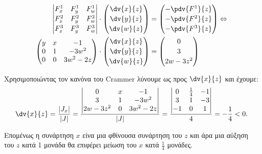\begin{solution}
  \begin{align*}
    \begin{vmatrix}
      F^1_x & F^1_y & F^1_w \\[2pt]
      F^2_x & F^2_y & F^2_w \\[2pt]
      F^3_x & F^3_y & F^3_w
    \end{vmatrix}\cdot 
    \begin{pmatrix}
      \dv{x}{z} \\[2pt]
      \dv{y}{z} \\[2pt]
      \dv{w}{z}
      \end{pmatrix}&=\begin{pmatrix}
      -\pdv{F^1}{z} \\[2pt]
      -\pdv{F^2}{z} \\[2pt]
      -\pdv{F^3}{z}
    \end{pmatrix}\Leftrightarrow \\
    \begin{pmatrix}
      y & x & -1 \\
      0 & 1 & -3w^2 \\
      0 & 0 & 3w^2-2z
      \end{pmatrix}\cdot \begin{pmatrix}
      \dv{x}{z} \\[2pt]
      \dv{y}{z} \\[2pt]
      \dv{w}{z}
      \end{pmatrix} &= \begin{pmatrix}
      0 \\[2pt]
      3\\[2pt]
      2w-3z^2
    \end{pmatrix}
  \end{align*}

  Χρησιμοποιώντας τον κανόνα του Crammer λύνουμε ως προς $\dv{x}{z}$ και έχουμε:
  \[
    \dv{x}{z}=\frac{|J_x|}{|J|}=\frac{\begin{vmatrix}
        0 & x & -1 \\
        3 & 1 & -3w^2 \\
        2w-3z^2 & 0 & 3w^2-2z 
        \end{vmatrix}}{|J|}=\frac{\begin{vmatrix}
        0 & \frac{1}{4} & -1 \\
        3 & 1 & -3 \\
        -1 & 0 & 1
    \end{vmatrix}}{4}=-\frac{1}{4}<0.
  \]

  Επομένως η συνάρτηση $x$ είνα μια φθίνουσα συνάρτηση του $z$ και άρα μια αύξηση του 
  $z$ κατά 1 μονάδα θα επιφέρει μείωση του $x$ κατά $\frac{1}{4}$ μονάδες.
    \end{solution}


    
